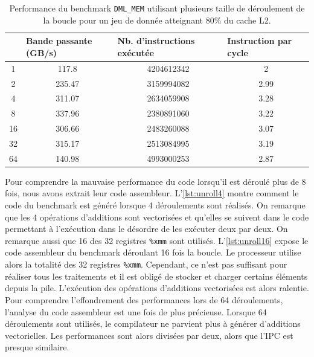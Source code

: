     \begin{table}[h!]
    \centering
    \begin{tabular}{|c|c|c|c|}
    \hline
    \rowcolor[HTML]{EFEFEF} 
    \multicolumn{1}{|l|}{\cellcolor[HTML]{EFEFEF}Nb. de déroulements} & \multicolumn{1}{l|}{\cellcolor[HTML]{EFEFEF}Bande passante (GB/s)} & \multicolumn{1}{l|}{\cellcolor[HTML]{EFEFEF}Nb. d'instructions exécutée} & \multicolumn{1}{l|}{\cellcolor[HTML]{EFEFEF}Instruction par cycle} \\ \hline
    1 & 117.8 & 4204612342 & 2 \\ \hline
    2 & 235.47 & 3159994082 & 2.99 \\ \hline
    4 & 311.07 & 2634059908 & 3.28 \\ \hline
    8 & 337.96 & 2380891060 & 3.22 \\ \hline
    16 & 306.66 & 2483260088 & 3.07 \\ \hline
    32 & 315.17 & 2513084995 & 3.19 \\ \hline
    64 & 140.98 & 4993000253 & 2.87 \\ \hline
    \end{tabular}%
    \caption{Performance du benchmark \texttt{DML\_MEM} utilisant plusieurs taille de déroulement de la boucle pour un jeu de donnée atteignant 80\% du cache L2.}
    \label{tab:dml_unroll_bench}
    \end{table}
    
    Pour comprendre la mauvaise performance du code lorsqu'il est déroulé plus de 8 fois, nous avons extrait leur code assembleur. L'\autoref{lst:unroll4} montre comment le code du benchmark est généré lorsque 4 déroulements sont réalisés. On remarque que les 4 opérations d'additions sont vectorisées et qu'elles se suivent dans le code permettant à l'exécution dans le désordre de les exécuter deux par deux. On remarque aussi que 16 des 32 registres \verb|%xmm| sont utilisés. L'\autoref{lst:unroll16} expose le code assembleur du benchmark déroulant 16 fois la boucle. Le processeur utilise alors la totalité des 32 registres \verb|%xmm|. Cependant, ce n'est pas suffisant pour réaliser tous les traitements et il est obligé de stocker et charger certains éléments depuis la pile. L'exécution des opérations d'additions vectorisées est alors ralentie. Pour comprendre l'effondrement des performances lors de 64 déroulements, l'analyse du code assembleur est une fois de plus précieuse. Lorsque 64 déroulements sont utilisés, le compilateur ne parvient plus à générer d'additions vectorielles. Les performances sont alors divisées par deux, alors que l'IPC est presque similaire. 
    

